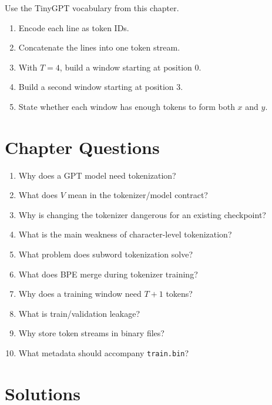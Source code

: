 Use the TinyGPT vocabulary from this chapter.

\begin{enumerate}
  \item Encode each line as token IDs.
  \item Concatenate the lines into one token stream.
  \item With \(T=4\), build a window starting at position 0.
  \item Build a second window starting at position 3.
  \item State whether each window has enough tokens to form both \(x\) and \(y\).
\end{enumerate}

\section{Chapter Questions}

\begin{enumerate}
  \item Why does a GPT model need tokenization?
  \item What does \(V\) mean in the tokenizer/model contract?
  \item Why is changing the tokenizer dangerous for an existing checkpoint?
  \item What is the main weakness of character-level tokenization?
  \item What problem does subword tokenization solve?
  \item What does BPE merge during tokenizer training?
  \item Why does a training window need \(T+1\) tokens?
  \item What is train/validation leakage?
  \item Why store token streams in binary files?
  \item What metadata should accompany \texttt{train.bin}?
\end{enumerate}

\section{Solutions}

